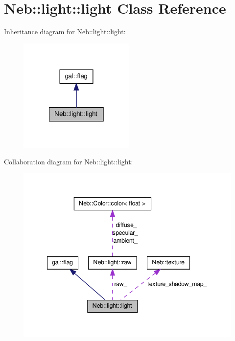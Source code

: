\hypertarget{classNeb_1_1light_1_1light}{\section{\-Neb\-:\-:light\-:\-:light \-Class \-Reference}
\label{classNeb_1_1light_1_1light}
}


\-Inheritance diagram for \-Neb\-:\-:light\-:\-:light\-:\nopagebreak
\begin{figure}[H]
\begin{center}
\leavevmode
\includegraphics[width=162pt]{classNeb_1_1light_1_1light__inherit__graph}
\end{center}
\end{figure}


\-Collaboration diagram for \-Neb\-:\-:light\-:\-:light\-:\nopagebreak
\begin{figure}[H]
\begin{center}
\leavevmode
\includegraphics[width=345pt]{classNeb_1_1light_1_1light__coll__graph}
\end{center}
\end{figure}
